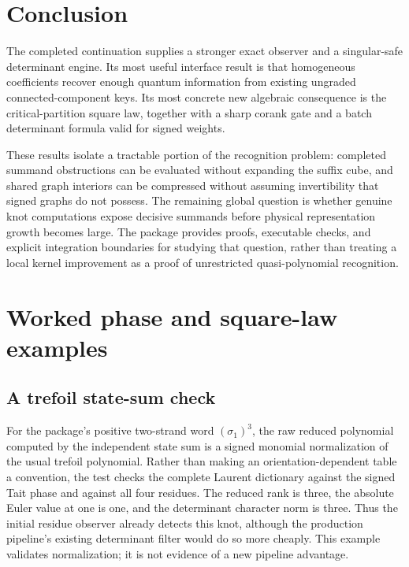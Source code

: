 \documentclass[11pt]{article}
\theoremstyle{definition}
\theoremstyle{remark}
\begin{document}
\section{Conclusion}
The completed continuation supplies a stronger exact observer and a
singular-safe determinant engine. Its most useful interface result is that
homogeneous coefficients recover enough quantum information from existing
ungraded connected-component keys. Its most concrete new algebraic
consequence is the critical-partition square law, together with a sharp
corank gate and a batch determinant formula valid for signed weights.

These results isolate a tractable portion of the recognition problem:
completed summand obstructions can be evaluated without expanding the
suffix cube, and shared graph interiors can be compressed without assuming
invertibility that signed graphs do not possess. The remaining global
question is whether genuine knot computations expose decisive summands
before physical representation growth becomes large. The package provides
proofs, executable checks, and explicit integration boundaries for studying
that question, rather than treating a local kernel improvement as a proof
of unrestricted quasi-polynomial recognition.

\appendix
\section{Worked phase and square-law examples}
\label{app:worked}

\subsection{A trefoil state-sum check}
For the package's positive two-strand word $(\sigma_1)^3$, the raw reduced
polynomial computed by the independent state sum is a signed monomial
normalization of the usual trefoil polynomial. Rather than making an
orientation-dependent table a convention, the test checks the complete
Laurent dictionary against the signed Tait phase and against all four
residues. The reduced rank is three, the absolute Euler value at one is one,
and the determinant character norm is three. Thus the initial residue
observer already detects this knot, although the production pipeline's
existing determinant filter would do so more cheaply. This example validates
normalization; it is not evidence of a new pipeline advantage.
\end{document}

